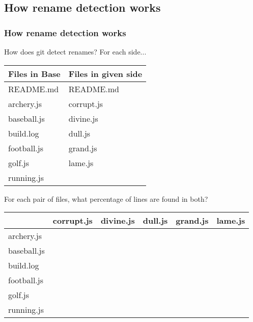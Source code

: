 \documentclass[compress,t]{beamer}
\begin{document}
\subsection[Detection]{How rename detection works}

\begin{frame}
  \frametitle{How rename detection works}

  How does git detect renames?  For each side...\\[0.25em]
  \pause
  \vspace*{-1.0\baselineskip}
  \begin{center}
    {\footnotesize
    \begin{tabular}{l|l}
      Files in Base  &  Files in given side \\
      \hline
      README.md      &  README.md   \\
      archery.js     &  corrupt.js  \\
      baseball.js    &  divine.js   \\
      build.log      &  dull.js     \\
      football.js    &  grand.js    \\
      golf.js        &  lame.js     \\
      running.js     &
    \end{tabular}
    }
  \end{center}
  \vspace*{-1.5\baselineskip}

  \pause
  \vspace*{\baselineskip}
  For each pair of files, what percentage of lines are found in both?
  \pause
  \vspace*{-0.25\baselineskip}
  \begin{center}
    {\footnotesize
    \begin{tabular}{l|l|l|l|l|l}
                   & corrupt.js & divine.js & dull.js & grand.js & lame.js \\
      \hline
      archery.js   &&&&& \\
      baseball.js  &&&&& \\
      build.log    &&&&& \\
      football.js  &&&&& \\
      golf.js      &&&&& \\
      running.js   &&&&&
    \end{tabular}
    }
  \end{center}

\end{frame}
\end{document}
